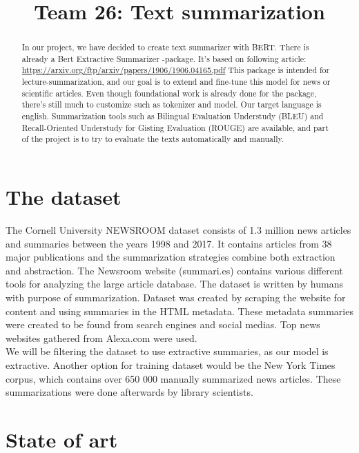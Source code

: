 \documentclass{article}
\title{Team 26: Text summarization}
\begin{document}
	
\maketitle

\begin{abstract}
\noindent
	In our project, we have decided to create text summarizer with BERT. 
	There is already a Bert Extractive Summarizer -package. It's based on following article: \href{https://arxiv.org/ftp/arxiv/papers/1906/1906.04165.pdf}{https://arxiv.org/ftp/arxiv/papers/1906/1906.04165.pdf}
	This package is intended for lecture-summarization, and our goal is to extend and fine-tune this model for news or scientific articles.
	Even though foundational work is already done for the package, there's still much to customize such as tokenizer and model. 
	Our target language is english. Summarization tools such as Bilingual Evaluation Understudy (BLEU) and Recall-Oriented Understudy for Gisting Evaluation (ROUGE) are available, and part of the project is to try to evaluate the texts automatically and manually.	
\end{abstract}

\clearpage
\section{The dataset}

The Cornell University NEWSROOM dataset \cite{dataset} consists of 1.3 million news articles and summaries between the years 1998 and 2017. It contains articles from 38 major publications and the summarization strategies combine both extraction and abstraction. The Newsroom website (summari.es) contains various different tools for analyzing the large article database. The dataset is written by humans with purpose of summarization. Dataset was created by scraping the website for content and using summaries in the HTML metadata. These metadata summaries were created to be found from search engines and social medias. Top news websites gathered from Alexa.com were used. \\

\noindent
We will be filtering the dataset \cite{dataset} to use extractive summaries, as our model is extractive. Another option for training dataset would be the New York Times corpus, which contains over 650 000 manually summarized news articles. These summarizations were done afterwards by library scientists. \cite{ny_dataset} 


\section{State of art }
\end{document}
